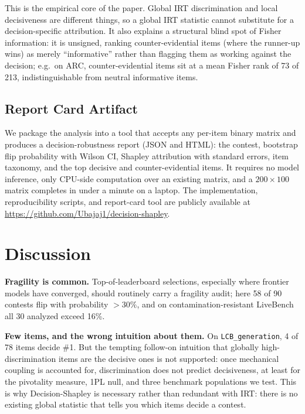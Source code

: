 \documentclass[conference]{IEEEtran}
\begin{document}
This is the empirical core of the paper.
Global IRT discrimination and local decisiveness are different things, so a global IRT statistic cannot substitute for a decision-specific attribution.
It also explains a structural blind spot of Fisher information: it is unsigned, ranking counter-evidential items (where the runner-up wins) as merely ``informative'' rather than flagging them as working against the decision; e.g.\ on ARC, counter-evidential items sit at a mean Fisher rank of 73 of 213, indistinguishable from neutral informative items.

\subsection{Report Card Artifact}
\label{sec:reportcard}

We package the analysis into a tool that accepts any per-item binary matrix and produces a decision-robustness report (JSON and HTML): the contest, bootstrap flip probability with Wilson CI, Shapley attribution with standard errors, item taxonomy, and the top decisive and counter-evidential items.
It requires no model inference, only CPU-side computation over an existing matrix, and a $200\times100$ matrix completes in under a minute on a laptop.
The implementation, reproducibility scripts, and report-card tool are publicly available at \url{https://github.com/Ubajaj1/decision-shapley}.

\section{Discussion}
\label{sec:discussion}

\textbf{Fragility is common.}
Top-of-leaderboard selections, especially where frontier models have converged, should routinely carry a fragility audit; here 58 of 90 contests flip with probability $>30\%$, and on contamination-resistant LiveBench all 30 analyzed exceed 16\%.

\textbf{Few items, and the wrong intuition about them.}
On \texttt{LCB\_generation}, 4 of 78 items decide \#1.
But the tempting follow-on intuition that globally high-discrimination items are the decisive ones is not supported: once mechanical coupling is accounted for, discrimination does not predict decisiveness, at least for the pivotality measure, 1PL null, and three benchmark populations we test.
This is why Decision-Shapley is necessary rather than redundant with IRT: there is no existing global statistic that tells you which items decide a contest.
\end{document}
